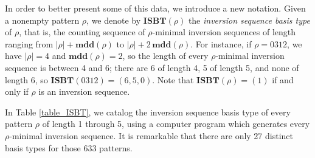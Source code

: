 \documentclass[a4paper,11pt]{article}
\theoremstyle{definition}
\theoremstyle{remark}
\newcommand{\mdd}{\mathbf{mdd}}
\newcommand{\ISBT}{\mathbf{ISBT}}
\begin{document}
In order to better present some of this data, we introduce a new notation. Given a nonempty pattern $\rho$, we denote by $\ISBT(\rho)$ the \emph{inversion sequence basis type} of $\rho$, that is, the counting sequence of $\rho$-minimal inversion sequences of length ranging from $|\rho| + \mdd(\rho)$ to $|\rho| + 2 \, \mdd(\rho)$. For instance, if $\rho = 0312$, we have $|\rho| = 4$ and $\mdd(\rho) = 2$, so the length of every $\rho$-minimal inversion sequence is between 4 and 6; there are 6 of length 4, 5 of length 5, and none of length 6, so $\ISBT(0312) = (6,5,0)$. Note that $\ISBT(\rho) = (1)$ if and only if $\rho$ is an inversion sequence.

In Table \ref{table_ISBT}, we catalog the inversion sequence basis type of every pattern $\rho$ of length 1 through 5, using a computer program which generates every $\rho$-minimal inversion sequence. It is remarkable that there are only 27 distinct basis types for those 633 patterns.
\end{document}
